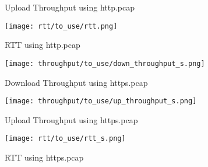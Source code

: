 \documentclass[12pt]{article}
\begin{document}
\begin{enumerate}
\begin{enumerate}
\begin{figure}[h!]
            \caption{Upload Throughput using http.pcap}
        \end{figure}
        \begin{figure}[h!]
            \centering
            \texttt{[image: rtt/to\_use/rtt.png]}
            \caption{RTT using http.pcap}
        \end{figure}
        \begin{figure}[h!]
            \centering
            \texttt{[image: throughput/to\_use/down\_throughput\_s.png]}
            \caption{Download Throughput using https.pcap}
        \end{figure}
        \begin{figure}[h!]
            \centering
            \texttt{[image: throughput/to\_use/up\_throughput\_s.png]}
            \caption{Upload Throughput using https.pcap}
        \end{figure}
        \begin{figure}[h!]
            \centering
            \texttt{[image: rtt/to\_use/rtt\_s.png]}
            \caption{RTT using https.pcap}
        \end{figure}
    \end{enumerate}
    
\end{enumerate}
\end{document}

